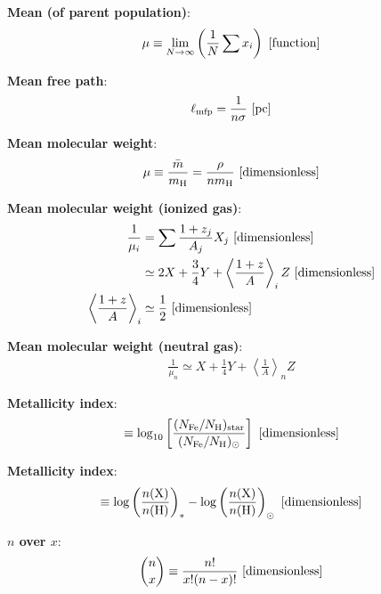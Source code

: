 \documentclass[a4paper,10pt]{article}
\begin{document}
{\noindent}\textbf{Mean (of parent population)}:
\begin{align*}
    \mu \equiv \lim_{N\rightarrow\infty}\left( \frac{1}{N} \sum x_i \right) ~ [{\rm function}]
\end{align*}

{\noindent}\textbf{Mean free path}:
\begin{align*}
    \ell_\mathrm{mfp} = \dfrac{1}{n\sigma} ~ [{\rm pc}]
\end{align*}

{\noindent}\textbf{Mean molecular weight}:
\begin{align*}
    \mu \equiv \frac{\bar{m}}{m_{\rm H}} = \frac{\rho}{nm_{\rm H}} ~ [{\rm dimensionless}]
\end{align*}

{\noindent}\textbf{Mean molecular weight (ionized gas)}:
\begin{align*}
    \frac{1}{\mu_i} &= \sum \frac{1+z_j}{A_j} X_j ~ [{\rm dimensionless}] \\
    &\simeq 2X + \frac{3}{4}Y + \left\langle\frac{1+z}{A}\right\rangle_i Z ~ [{\rm dimensionless}] \\
    \left\langle\frac{1+z}{A}\right\rangle_i &\simeq \frac{1}{2} ~ [{\rm dimensionless}]
\end{align*}

{\noindent}\textbf{Mean molecular weight (neutral gas)}:
\begin{align*}
    \frac{1}{\mu_n} \simeq X + \frac{1}{4}Y + \left\langle\frac{1}{A}\right\rangle_n Z
\end{align*}

{\noindent}\textbf{Metallicity index}:
\begin{align*}
    [{\rm Fe/H}] \equiv \log_{10} \left[\frac{(N_{\rm Fe}/N_{\rm H})_{\rm star}}{(N_{\rm Fe}/N_{\rm H})_\odot}\right] ~ [{\rm dimensionless}]
\end{align*}

{\noindent}\textbf{Metallicity index}:
\begin{align*}
    [\mathrm{X}/\mathrm{H}] \equiv \log\left(\frac{n(\mathrm{X})}{n(\mathrm{H})}\right)_* -\log\left(\frac{n(\mathrm{X})}{n(\mathrm{H})}\right)_\odot ~ [{\rm dimensionless}]
\end{align*}

{\noindent}\textbf{$n$ over $x$}:
\begin{align*}
    \binom{n}{x} \equiv \frac{n!}{x!(n-x)!} ~ [{\rm dimensionless}]
\end{align*}
\end{document}
